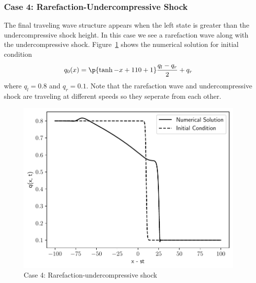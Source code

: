 \subsubsection{Case 4: Rarefaction-Undercompressive Shock}\label{sssec:case4}
The final traveling wave structure appears when the left state is greater than the
undercompressive shock height.
In this case we see a rarefaction wave along with the undercompressive shock.
Figure~\ref{fig:case4} shows the numerical solution for initial condition
\begin{equation}
  q_0(x) = \p{\tanh{-x + 110} + 1} \frac{q_l - q_r}{2} + q_r
\end{equation}
where \(q_l = 0.8\) and \(q_r = 0.1\).
Note that the rarefaction wave and undercompressive shock are traveling at different
speeds so they seperate from each other.
\begin{figure}
  \centering
  \includegraphics[scale=0.5]{figures/case_4_1.pdf}
  \caption{Case 4: Rarefaction-undercompressive shock}\label{fig:case4}
\end{figure}

\clearpage
\pagebreak